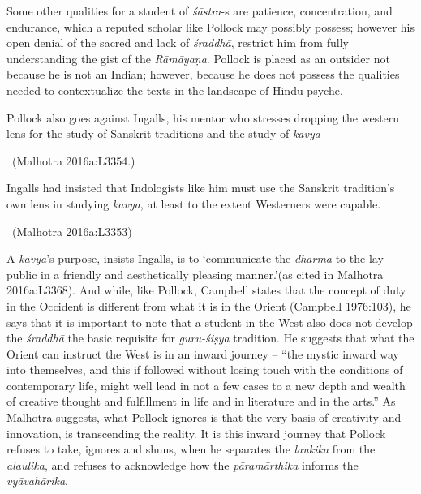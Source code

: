Some other qualities for a student of \textit{śāstra}-s are patience, concentration, and endurance, which a reputed scholar like Pollock may possibly possess; however his open denial of the sacred and lack of \textit{śraddhā}, restrict him from fully understanding the gist of the \textit{Rāmāyaṇa}. Pollock is placed as an outsider not because he is not an Indian; however, because he does not possess the qualities needed to contextualize the texts in the landscape of Hindu psyche.

\newpage

\begin{myquote}
Pollock also goes against Ingalls, his mentor who stresses dropping the western lens for the study of Sanskrit traditions and the study of \textit{kavya} 

~\hfill (Malhotra 2016a:L3354.)
\end{myquote}

\begin{myquote}
Ingalls had insisted that Indologists like him must use the Sanskrit tradition’s own lens in studying \textit{kavya}, at least to the extent Westerners were capable. 

~\hfill (Malhotra 2016a:L3353)
\end{myquote}

A \textit{kāvya}’s purpose, insists Ingalls, is to ‘communicate the \textit{dharma} to the lay public in a friendly and aesthetically pleasing manner.’(as cited in Malhotra 2016a:L3368). And while, like Pollock, Campbell states that the concept of duty in the Occident is different from what it is in the Orient (Campbell 1976:103), he says that it is important to note that a student in the West also does not develop the \textit{śraddhā} the basic requisite for \textit{guru-śiṣya} tradition. He suggests that what the Orient can instruct the West is in an inward journey – “the mystic inward way into themselves, and this if followed without losing touch with the conditions of contemporary life, might well lead in not a few cases to a new depth and wealth of creative thought and fulfillment in life and in literature and in the arts.” As Malhotra suggests, what Pollock ignores is that the very basis of creativity and innovation, is transcending the reality. It is this inward journey that Pollock refuses to take, ignores and shuns, when he separates the \textit{laukika} from the \textit{alaulika}, and refuses to acknowledge how the \textit{pāramārthika} informs the \textit{vyāvahārika}.

